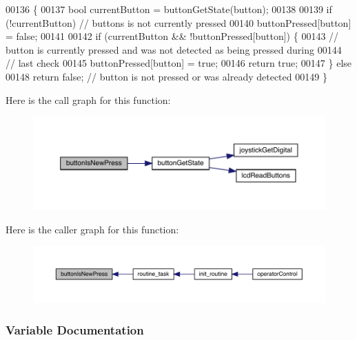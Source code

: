 \begin{DoxyCode}
00136                                        \{
00137   \textcolor{keywordtype}{bool} currentButton = buttonGetState(button);
00138 
00139   \textcolor{keywordflow}{if} (!currentButton) \textcolor{comment}{// buttons is not currently pressed}
00140     buttonPressed[button] = \textcolor{keyword}{false};
00141 
00142   \textcolor{keywordflow}{if} (currentButton && !buttonPressed[button]) \{
00143     \textcolor{comment}{// button is currently pressed and was not detected as being pressed during}
00144     \textcolor{comment}{// last check}
00145     buttonPressed[button] = \textcolor{keyword}{true};
00146     \textcolor{keywordflow}{return} \textcolor{keyword}{true};
00147   \} \textcolor{keywordflow}{else}
00148     \textcolor{keywordflow}{return} \textcolor{keyword}{false}; \textcolor{comment}{// button is not pressed or was already detected}
00149 \}
\end{DoxyCode}
Here is the call graph for this function\+:
\nopagebreak
\begin{figure}[H]
\begin{center}
\leavevmode
\includegraphics[width=350pt]{toggle_8c_a07c56bf50097f5bf35c5e8c9067800e1_cgraph}
\end{center}
\end{figure}
Here is the caller graph for this function\+:
\nopagebreak
\begin{figure}[H]
\begin{center}
\leavevmode
\includegraphics[width=350pt]{toggle_8c_a07c56bf50097f5bf35c5e8c9067800e1_icgraph}
\end{center}
\end{figure}


\subsubsection{Variable Documentation}
\mbox{\label{toggle_8c_a66c983ca3b3f041a4e293f814a41198f}} 
